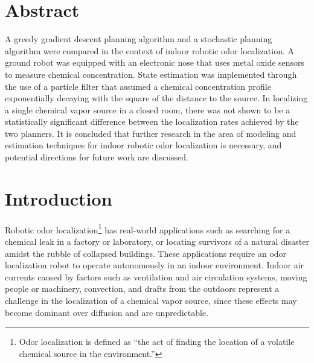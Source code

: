\documentclass[submit, 12pt]{aiaa-pretty-modified}
\begin{document}


\newpage
\section*{Abstract}
A greedy gradient descent planning algorithm and a stochastic planning algorithm
were compared in the context of indoor robotic odor localization. A ground robot
was equipped with an electronic nose that uses metal oxide sensors to measure
chemical concentration. State estimation was implemented through the use of a
particle filter that assumed a chemical concentration profile exponentially
decaying with the square of the distance to the source. In localizing a single
chemical vapor source in a closed room, there was not shown to be a
statistically significant difference between the localization rates achieved by
the two planners. It is concluded that further research in the area of modeling
and estimation techniques for indoor robotic odor localization is necessary, and
potential directions for future work are discussed.


\newpage

\tableofcontents

\newpage

\listoffigures

\newpage

\listoftables

\newpage
\onehalfspace

\section{Introduction}

Robotic odor localization\footnote{Odor localization
  is defined as ``the act of finding the location of a
volatile chemical source in the environment.''\cite{kowadlo}} has real-world applications such as searching for a chemical leak in a
factory or laboratory, or locating survivors of a natural disaster
amidst the rubble of collapsed buildings.  These applications require an odor localization robot to operate autonomously
in an indoor environment.  Indoor air currents caused by
factors such as
ventilation and air circulation systems, moving people or machinery,
convection, and drafts from the outdoors represent a challenge in the
localization of a chemical vapor source,
since these effects may become dominant over diffusion and are unpredictable.
\end{document}
